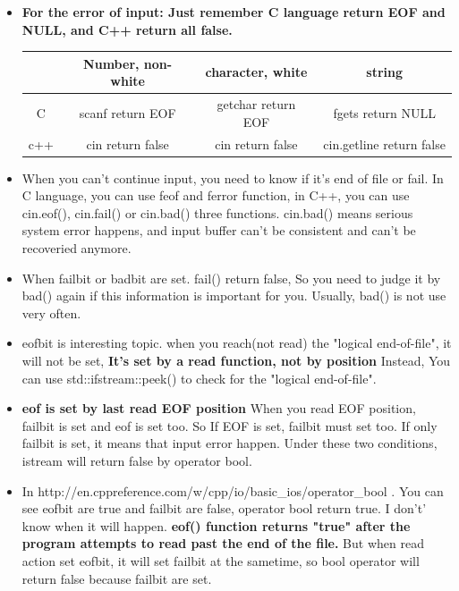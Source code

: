 \documentclass[a4paper,12pt,twoside]{book}
\begin{document}
\begin{itemize}
\item \textbf{For the error of input: Just remember C language return EOF and NULL, and C++ return all false. }

 \begin{tabular}{|c|c|c|c|}
 \hline
  & Number, non-white & character, white  & string \\
 \hline
 C & scanf return EOF & getchar return EOF & fgets return NULL \\
 \hline
 c++ & cin return false & cin return false & cin.getline return false \\
 \hline
 \end{tabular}

 \item When you can't continue input, you need to know if it's end of file or fail. In C language, you can use feof and ferror function, in C++, you can use cin.eof(), cin.fail() or cin.bad() three functions. cin.bad() means serious system error happens, and input buffer can't be consistent and can't be recoveried anymore.

 \item When failbit or badbit are set. fail() return false, So you need to judge it by bad() again if this information is important for you.  Usually, bad() is not use very often.

\item eofbit is interesting topic. when you reach(not read) the "logical end-of-file", it will not be set, \textbf{It's set by a read function, not by position}   Instead,  You can use std::ifstream::peek() to check for the "logical end-of-file".

 \item \textbf{eof is set by last read EOF position} When you read EOF position, failbit is set and eof is set too. So If EOF is set, failbit must set too.  If only failbit is set, it means that input error happen.  Under these two conditions, istream will return false by operator bool.

\item In http://en.cppreference.com/w/cpp/io/basic\_ios/operator\_bool . You can see eofbit are true and failbit are false, operator bool return true. I don't' know when it will happen. \textbf{ eof() function returns "true" after the program attempts to read past the end of the file.}  But when read action set eofbit, it will set failbit at the sametime, so bool operator will return false because failbit are set.


\end{itemize}
\end{document}
